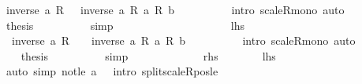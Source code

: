\begin{isabellebody}
\ {\isachardoublequoteopen}inverse\ a\ {\isacharasterisk}{\kern0pt}\isactrlsub R\ {}\ {\isasymle}\ inverse\ a\ {\isacharasterisk}{\kern0pt}\isactrlsub R\ {\isacharparenleft}{\kern0pt}a\ {\isacharasterisk}{\kern0pt}\isactrlsub R\ b{\isacharparenright}{\kern0pt}{\isachardoublequoteclose}\isanewline
\ \ \ \ \ \ \ \ \isamarkupfalse%
\ {\isacharparenleft}{\kern0pt}intro\ scaleR{\isacharunderscore}{\kern0pt}mono{\isacharparenright}{\kern0pt}\ auto\isanewline
\ \ \ \ \ \ \isamarkupfalse%
\ {}\ \isamarkupfalse%
\ {\isacharquery}{\kern0pt}thesis\isanewline
\ \ \ \ \ \ \ \ \isamarkupfalse%
\ simp\isanewline
\ \ \ \ \isamarkupfalse%
\isanewline
\ \ \ \ \ \ \isamarkupfalse%
\ {}\isanewline
\ \ \ \ \ \ \isamarkupfalse%
\ {\isacartoucheopen}{\isacharquery}{\kern0pt}lhs{\isacartoucheclose}\ \isamarkupfalse%
\ {\isachardoublequoteopen}{\isacharminus}{\kern0pt}\ inverse\ a\ {\isacharasterisk}{\kern0pt}\isactrlsub R\ {}\ {\isasymle}\ {\isacharminus}{\kern0pt}\ inverse\ a\ {\isacharasterisk}{\kern0pt}\isactrlsub R\ {\isacharparenleft}{\kern0pt}a\ {\isacharasterisk}{\kern0pt}\isactrlsub R\ b{\isacharparenright}{\kern0pt}{\isachardoublequoteclose}\isanewline
\ \ \ \ \ \ \ \ \isamarkupfalse%
\ {\isacharparenleft}{\kern0pt}intro\ scaleR{\isacharunderscore}{\kern0pt}mono{\isacharparenright}{\kern0pt}\ auto\isanewline
\ \ \ \ \ \ \isamarkupfalse%
\ {}\ \isamarkupfalse%
\ {\isacharquery}{\kern0pt}thesis\isanewline
\ \ \ \ \ \ \ \ \isamarkupfalse%
\ simp\isanewline
\ \ \ \ \isamarkupfalse%
\isanewline
\ \ \isamarkupfalse%
\isanewline
\ \ \ \ \isamarkupfalse%
\ {\isacharquery}{\kern0pt}rhs\isanewline
\ \ \ \ \isamarkupfalse%
\ \isamarkupfalse%
\ {\isacharquery}{\kern0pt}lhs\isanewline
\ \ \ \ \ \ \isamarkupfalse%
\ {\isacharparenleft}{\kern0pt}auto\ simp{\isacharcolon}{\kern0pt}\ not{\isacharunderscore}{\kern0pt}le\ {\isacartoucheopen}a\ {\isasymnoteq}\ {}{\isacartoucheclose}\ intro{\isacharbang}{\kern0pt}{\isacharcolon}{\kern0pt}\ split{\isacharunderscore}{\kern0pt}scaleR{\isacharunderscore}{\kern0pt}pos{\isacharunderscore}{\kern0pt}le{\isacharparenright}{\kern0pt}\isanewline
\ \ \isamarkupfalse%
\isanewline
{}\isamarkupfalse%
%
\endisatagproof
{\isafoldproof}%
%
\isadelimproof
\isanewline

\end{isabellebody}
